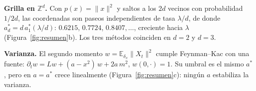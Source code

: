 \documentclass{article}
\begin{document}
\textbf{Grilla en $\mathbb{Z}^d$.} Con $p(x)=\|x\|^2$ y saltos a los $2d$ vecinos con probabilidad $1/2d$, las coordenadas son paseos independientes de tasa $\lambda/d$, de donde $a^*_d=d\,a^*_1(\lambda/d)$: $0.6215$, $0.7724$, $0.8407,\dots$, creciente hacia $\lambda$ (Figura~\ref{fig:resumen}b). Los tres métodos coinciden en $d=2$ y $d=3$.

\textbf{Varianza.} El segundo momento $w=\mathbb{E}_{\delta_x}\|X_t\|^2$ cumple Feynman--Kac con una fuente: $\partial_t w = Lw+(a-x^2)\,w+2a\,m^2$, $w(0,\cdot)=1$. Su umbral es el mismo $a^*$, pero en $a=a^*$ crece linealmente (Figura~\ref{fig:resumen}c): ningún $a$ estabiliza la varianza.
\end{document}
